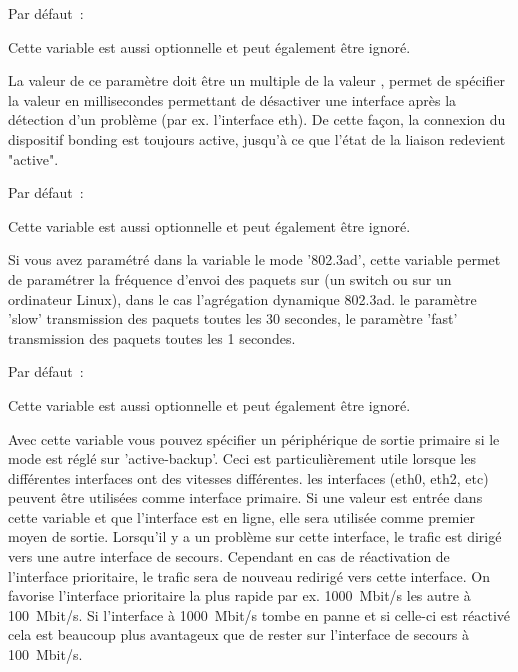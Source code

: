 \begin{description}
  Par défaut~: 

  Cette variable est aussi optionnelle et peut également être ignoré.

  La valeur de ce paramètre doit être un multiple de la valeur
  , permet de spécifier la valeur en millisecondes
  permettant de désactiver une interface après la détection d'un problème
  (par ex. l'interface eth). De cette façon, la connexion du dispositif bonding
  est toujours active, jusqu'à ce que l'état de la liaison redevient "active".


  Par défaut~: 

  Cette variable est aussi optionnelle et peut également être ignoré.

  Si vous avez paramétré dans la variable  le mode
  '802.3ad', cette variable permet de paramétrer la fréquence d'envoi des paquets
  sur (un switch ou sur un ordinateur Linux), dans le cas l'agrégation dynamique
  802.3ad. le paramètre 'slow' transmission des paquets toutes les 30 secondes,
  le paramètre 'fast' transmission des paquets toutes les 1 secondes.


  Par défaut~: 

  Cette variable est aussi optionnelle et peut également être ignoré.

  Avec cette variable vous pouvez spécifier un périphérique de sortie primaire si
  le mode est réglé sur 'active-backup'. Ceci est particulièrement utile lorsque
  les différentes interfaces ont des vitesses différentes. les interfaces (eth0, eth2, etc)
  peuvent être utilisées comme interface primaire. Si une valeur est entrée dans cette
  variable et que l'interface est en ligne, elle sera utilisée comme premier moyen de
  sortie. Lorsqu'il y a un problème sur cette interface, le trafic est dirigé vers une
  autre interface de secours. Cependant en cas de réactivation de l'interface prioritaire,
  le trafic sera de nouveau redirigé vers cette interface. On favorise l'interface prioritaire
  la plus rapide par ex. 1000~Mbit/s les autre à 100~Mbit/s. Si l'interface à 1000~Mbit/s
  tombe en panne et si celle-ci est réactivé cela est beaucoup plus avantageux que de
  rester sur l'interface de secours à 100~Mbit/s.


\end{description}
